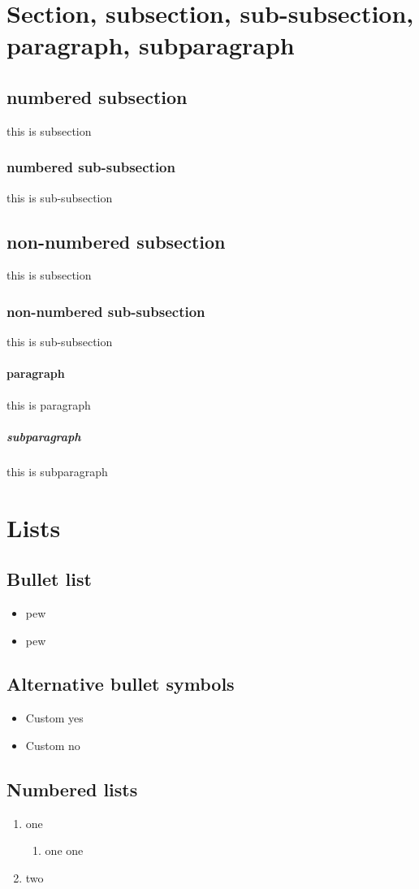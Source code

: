 \documentclass{article}
\begin{document}
\section{Section, subsection, sub-subsection, paragraph, subparagraph}
\subsection{numbered subsection}
this is subsection
\subsubsection{numbered sub-subsection}
this is sub-subsection
\subsection*{non-numbered subsection}
this is subsection
\subsubsection*{non-numbered sub-subsection}
this is sub-subsection
\paragraph{paragraph}
this is paragraph
\subparagraph{subparagraph}
this is subparagraph

\section{Lists}
\subsection{Bullet list}
\begin{itemize}
    \item pew
    \item pew
\end{itemize}

\subsection{Alternative bullet symbols}
\begin{itemize}
    \item[\Checkmark]  Custom yes
    \item[\XSolidBrush]  Custom no
\end{itemize}

\subsection{Numbered lists}
\begin{enumerate}
    \item one
    \begin{enumerate}[label*=\arabic*.]
        \item one one
    \end{enumerate}
    \item two
\end{enumerate}
\end{document}
